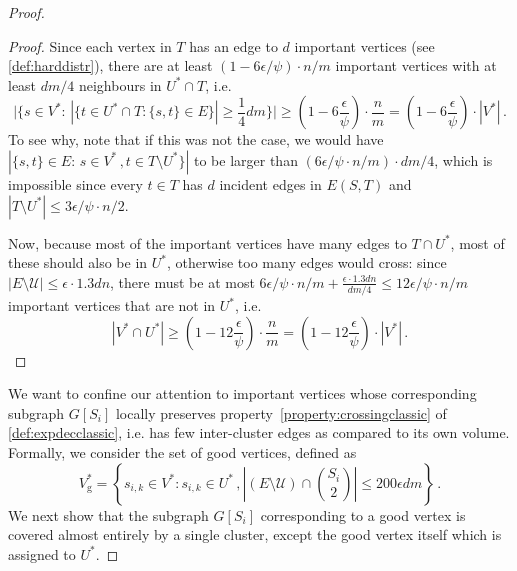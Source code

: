 \begin{proof}
\begin{proof}
		Since each vertex in $T$ has an edge to $d$ important vertices (see \cref{def:harddistr}), there are at least $(1-6\epsilon/\psi) \cdot n/m$ important vertices with at least $dm/4$ neighbours in $U^* \cap T$, i.e.
		\begin{equation*}
			\Big|\Big\{s \in V^*: \, \left|\{t \in U^* \cap T: \{s,t\} \in E\}\right| \ge \frac{1}{4}dm\Big\}\Big| \ge  \left(1-6\frac{\epsilon}{\psi}\right) \cdot \frac{n}{m} = \left(1-6\frac{\epsilon}{\psi}\right)\cdot |V^*| \, .
		\end{equation*}
		To see why, note that if this was not the case, we would have $|\{s,t\} \in E:\, s \in V^*\, , t\in T \setminus U^* \}|$ to be larger than $ (6\epsilon/\psi \cdot n/m) \cdot dm/4$, which is impossible since every $t \in T$ has $d$ incident edges in $E(S,T)$ and $|T \setminus U^*| \le 3\epsilon/\psi \cdot n/2$.
		
		Now, because most of the important vertices have many edges to $T \cap U^*$, most of these should also be in $U^*$, otherwise too many edges would cross: since $|E \setminus \mathcal{U}| \le \epsilon \cdot 1.3 dn$, there must be at most $6\epsilon/\psi \cdot n/m+\frac{\epsilon \cdot 1.3 dn}{dm/4} \le 12\epsilon/\psi \cdot n/m$ important vertices that are not in $U^*$, i.e.
		\begin{equation*}
			|V^* \cap U^*| \ge \left(1-12\frac{\epsilon}{\psi}\right) \cdot \frac{n}{m}  =  \left(1-12\frac{\epsilon}{\psi}\right) \cdot |V^*| \, .
		\end{equation*}
	\end{proof}
	\noindent
	We want to confine our attention to important vertices whose corresponding subgraph $G[S_i]$ locally preserves property~\eqref{property:crossingclassic} of \cref{def:expdecclassic}, i.e. has few inter-cluster edges as compared to its own volume. Formally, we consider the set of good vertices, defined as
	\begin{equation}
		\label{eq:defgoodvertex}
		V^*_{\text{g}} = \left\{s_{i,k} \in V^* : s_{i,k} \in U^* \, , \left|(E \setminus \mathcal{U}) \cap \binom{S_i}{2}\right| \le {200\epsilon} dm\right\} \, .
	\end{equation}
	We next show that the subgraph $G[S_i]$ corresponding to a good vertex is covered almost entirely by a single cluster, except the good vertex itself which is assigned to $U^*$.
	

\end{proof}

